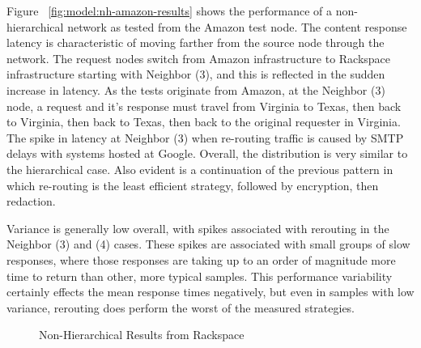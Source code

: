 Figure ~\ref{fig:model:nh-amazon-results} shows the performance of a non-hierarchical network as tested from the Amazon test node.  The content response latency is characteristic of moving farther from the source node through the network.  The request nodes switch from Amazon infrastructure to Rackspace infrastructure starting with Neighbor (3), and this is reflected in the sudden increase in latency.  As the tests originate from Amazon, at the Neighbor (3) node, a request and it's response must travel from Virginia to Texas, then back to Virginia, then back to Texas, then back to the original requester in Virginia.  The spike in latency at Neighbor (3) when re-routing traffic is caused by SMTP delays with systems hosted at Google.  Overall, the distribution is very similar to the hierarchical case.  Also evident is a continuation of the previous pattern in which re-routing is the least efficient strategy, followed by encryption, then redaction.

Variance is generally low overall, with spikes associated with rerouting in the Neighbor (3) and (4) cases.  These spikes are associated with small groups of slow responses, where those responses are taking up to an order of magnitude more time to return than other, more typical samples.  This performance variability certainly effects the mean response times negatively, but even in samples with low variance, rerouting does perform the worst of the measured strategies.


\begin{figure}[htbp]
\begin{minipage}[b]{0.5\linewidth}
\centering
{}
\end{minipage}
\begin{minipage}[b]{0.5\linewidth}
\centering
{}
\end{minipage}
\caption{Non-Hierarchical Results from Rackspace}
\label{fig:model:nh-rackspace-results}
\end{figure}

